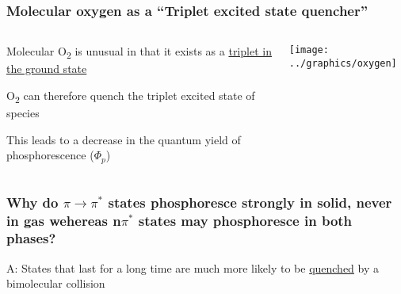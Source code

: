 \documentclass[ignorenonframetext]{beamer}
\begin{document}
\begin{frame}
\frametitle{Molecular oxygen as a ``Triplet excited state quencher''}
\begin{columns}[onlytextwidth]
\begin{column}{.5\textwidth}

Molecular O\textsubscript{2} is unusual in that it exists as a \underline{triplet in the ground state}

O\textsubscript{2} can therefore quench the triplet excited state of species

This leads to a decrease in the quantum yield of phosphorescence (\(\Phi_p\))

\end{column}
\begin{column}{.5\textwidth}

\texttt{[image: ../graphics/oxygen]}
\end{column}
\end{columns}
\end{frame}
	
\begin{frame}
\frametitle{Why do \(\pi \rightarrow \pi^*\) states phosphoresce strongly in solid, never in gas wehereas n\(\pi^*\) states may phosphoresce in both phases?}
A: States that last for a long time are much more likely to be \underline{quenched} by a bimolecular collision

\end{frame}
\end{document}
